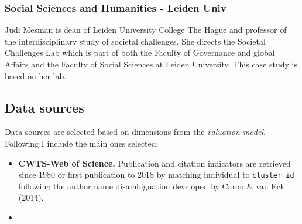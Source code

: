 \documentclass[]{elsarticle} %
\begin{document}
\hypertarget{social-sciences-and-humanities---leiden-univ}{%
\subsubsection{Social Sciences and Humanities - Leiden
Univ}\label{social-sciences-and-humanities---leiden-univ}}

Judi Mesman is dean of Leiden University College The Hague and professor
of the interdisciplinary study of societal challenges. She directs the
Societal Challenges Lab which is part of both the Faculty of Governance
and global Affairs and the Faculty of Social Sciences at Leiden
University. This case study is based on her lab.

\hypertarget{data-sources}{%
\subsection{Data sources}\label{data-sources}}

Data sources are selected based on dimensions from the \emph{valuation
model}. Following I include the main ones selected:

\begin{itemize}
\item
  \textbf{CWTS-Web of Science.} Publication and citation indicators are
  retrieved since 1980 or first publication to 2018 by matching
  individual to \texttt{cluster\_id} following the author name
  disambiguation developed by Caron \& van Eck (2014).
\item
\end{itemize}
\end{document}
